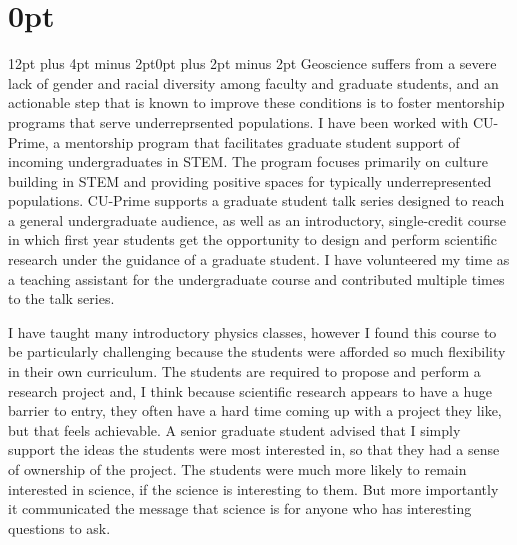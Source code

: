 \documentclass[12pt]{article}
\author{}
\date{}
\begin{document}
\pagestyle{fancy}
\thispagestyle{fancy}
\fancyhf{} %
\fancyhead[L]{\textcolor{red}{Tobias Oliver\\
Contributions Towards Building a Diverse and Inclusive Field}}
\fancyfoot[R]{\thepage}
\titlespacing\section{0pt}{12pt plus 4pt minus 2pt}{0pt plus 2pt minus 2pt}
Geoscience suffers from a severe lack of gender and racial diversity among faculty and graduate students\cite{kD20}, and an actionable step that is known to improve these conditions is to foster mentorship programs that serve underreprsented populations\cite{jH07}.
I have been worked with CU-Prime, a mentorship program that facilitates graduate student support of incoming undergraduates in STEM. 
The program focuses primarily on culture building in STEM and providing positive spaces for typically underrepresented populations.
CU-Prime supports a graduate student talk series designed to reach a general undergraduate audience, as well as an introductory, single-credit course in which first year students get the opportunity to design and perform scientific research under the guidance of a graduate student. 
I have volunteered my time as a teaching assistant for the undergraduate course and contributed multiple times to the talk series. 

I have taught many introductory physics classes,
however I found this course to be particularly challenging because the students were afforded so much flexibility in their own curriculum.
The students are required to propose and perform a research project and, I think because scientific research appears to have a huge barrier to entry, they often have a hard time coming up with a project they like, but that feels achievable. 
A senior graduate student advised that I simply support the ideas the students were most interested in, so that they had a sense of ownership of the project.
The students were much more likely to remain interested in science, if the science is interesting to them. 
But more importantly it communicated the message that science is for anyone who has interesting questions to ask.
\end{document}
